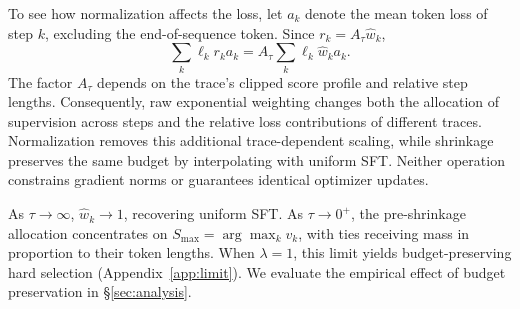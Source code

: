 To see how normalization affects the loss, let $a_k$
denote the mean token loss of step $k$, excluding the
end-of-sequence token. Since $r_k=A_\tau\hat w_k$,
\begin{equation}
\sum_k\ell_kr_ka_k
=A_\tau\sum_k\ell_k\hat w_ka_k.
\label{eq:raw-scale}
\end{equation}
The factor $A_\tau$ depends on the trace's clipped score
profile and relative step lengths. Consequently, raw
exponential weighting changes both the allocation of
supervision across steps and the relative loss
contributions of different traces. Normalization removes
this additional trace-dependent scaling, while shrinkage
preserves the same budget by interpolating with uniform
SFT. Neither operation constrains gradient norms or
guarantees identical optimizer updates.

As $\tau\to\infty$, $\hat w_k\to1$, recovering uniform
SFT. As $\tau\to0^+$, the pre-shrinkage allocation
concentrates on $S_{\max}=\arg\max_kv_k$, with ties
receiving mass in proportion to their token lengths.
When $\lambda=1$, this limit yields budget-preserving
hard selection (Appendix~\ref{app:limit}). We evaluate
the empirical effect of budget preservation in
\S\ref{sec:analysis}.
